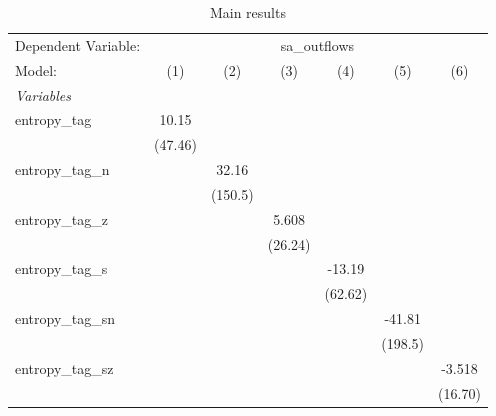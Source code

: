 
\begin{table}[htbp]
   \centering
   \footnotesize
   \begin{threeparttable}[b]
      \caption{\label{tab:reg_sa_outflows_tag.tex} Main results}
      \begin{tabular}{lcccccc}
         \tabularnewline \midrule \midrule
         Dependent Variable: & \multicolumn{6}{c}{sa\_outflows}\\
         Model:              & (1)           & (2)           & (3)           & (4)           & (5)           & (6)\\  
         \midrule
         \emph{Variables}\\
         entropy\_tag        & 10.15         &               &               &               &               &   \\   
                             & (47.46)       &               &               &               &               &   \\   
         entropy\_tag\_n     &               & 32.16         &               &               &               &   \\   
                             &               & (150.5)       &               &               &               &   \\   
         entropy\_tag\_z     &               &               & 5.608         &               &               &   \\   
                             &               &               & (26.24)       &               &               &   \\   
         entropy\_tag\_s     &               &               &               & -13.19        &               &   \\   
                             &               &               &               & (62.62)       &               &   \\   
         entropy\_tag\_sn    &               &               &               &               & -41.81        &   \\   
                             &               &               &               &               & (198.5)       &   \\   
         entropy\_tag\_sz    &               &               &               &               &               & -3.518\\   
                             &               &               &               &               &               & (16.70)\\   

\end{tabular}
\end{threeparttable}
\end{table}
